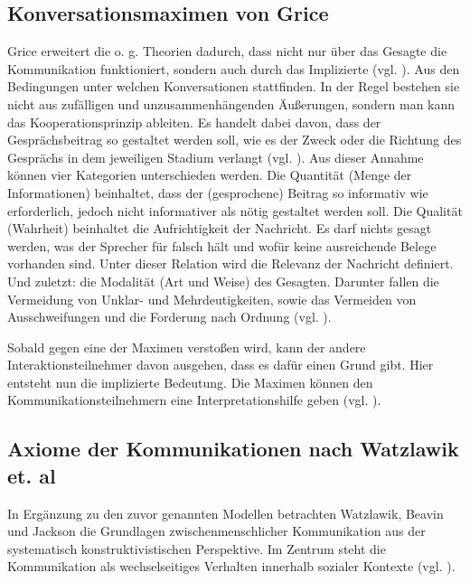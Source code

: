 \subsection{Konversationsmaximen von Grice}
Grice erweitert die o. g. Theorien dadurch, dass nicht nur über das Gesagte die Kommunikation funktioniert, sondern auch durch das Implizierte (vgl. \cite[S. 43f]{grice1975logic}). Aus den Bedingungen unter welchen Konversationen stattfinden. In  der Regel bestehen sie nicht aus zufälligen und unzusammenhängenden Äußerungen, sondern man kann das Kooperationsprinzip ableiten. Es handelt dabei davon, dass der Gesprächsbeitrag so gestaltet werden soll, wie es der Zweck oder die Richtung des Gesprächs in dem jeweiligen Stadium verlangt (vgl. \cite[S. 45]{grice1975logic}).
Aus dieser Annahme können vier Kategorien unterschieden werden. Die Quantität (Menge der Informationen) beinhaltet, dass der (gesprochene) Beitrag so informativ wie erforderlich, jedoch nicht informativer als nötig gestaltet werden soll. Die Qualität (Wahrheit) beinhaltet die Aufrichtigkeit der Nachricht. Es darf nichts gesagt werden, was der Sprecher für falsch hält und wofür keine ausreichende Belege vorhanden sind. Unter dieser Relation wird die Relevanz der Nachricht definiert. Und zuletzt: die Modalität (Art und Weise) des Gesagten. Darunter fallen die Vermeidung von Unklar- und Mehrdeutigkeiten, sowie das Vermeiden von Ausschweifungen und die Forderung nach Ordnung (vgl. \cite[S. 45f]{grice1975logic}).

Sobald gegen eine der Maximen verstoßen wird, kann der andere Interaktionsteilnehmer davon ausgehen, dass es dafür einen Grund gibt. Hier entsteht nun die implizierte Bedeutung. Die Maximen können den Kommunikationsteilnehmern eine Interpretationshilfe geben (vgl. \cite[S. 49f]{grice1975logic}).

\subsection{Axiome der Kommunikationen nach Watzlawik et. al}
In Ergänzung zu den zuvor genannten Modellen betrachten Watzlawik, Beavin und Jackson die Grundlagen zwischenmenschlicher Kommunikation aus der systematisch konstruktivistischen Perspektive. Im Zentrum steht die Kommunikation als wechselseitiges Verhalten innerhalb sozialer Kontexte (vgl. \cite{Watzlawick2016-km}). 

